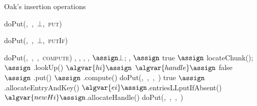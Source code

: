 \begin{algorithm}[htb]
\setlength\belowcaptionskip{0pt}
\setlength\abovecaptionskip{0pt}
\small
\caption{Oak's insertion operations}
\label{alg:doput}
\begin{algorithmic}
\State doPut(\key,\ \givenvalue,\ $\bot$,\ \textsc{put})
\State \Return 
\EndProcedure

\State \Return doPut(\key,\ \givenvalue,\ $\bot$,\ \textsc{putIf})
\EndProcedure


\State doPut(\key,\ \givenvalue,\ ,\ \textsc{compute})
\State \Return 
\EndProcedure
\Statex
{}
\State {}, , , ,  $\assign \bot$; ,  $\assign$ true
\State {} $\assign$ locateChunk(\key); 
{} $\assign$ .lookUp(\key)
  $\algvar{hi} \assign$ 
\EndIf
{} $\algvar{handle} \assign $
\EndIf
{} 
 \label{line:handle.deleted}
 \Return false \label{line:putIf returns false}
\EndIf
{}  $\assign$ .put(\givenvalue) \label{line:handleput}
\EndIf
{} 
\State {} $\assign$ .compute() \label{line:handlecompute}
\EndIf
{} 
\State \Return doPut(\key,\ \givenvalue,\ ,\ ) \label{line:doputretry}
\EndIf
\State \Return true \label{line:doput end case 1}
\EndIf
{}
\State {} $\assign$ .allocateEntryAndKey(\key) \label{line:allocateentry}
\State $\algvar{ei} \assign $.entriesLLputIfAbsent() \label{line:linkentry}
\EndIf
\State $\algvar{newHi} \assign $.allocateHandle() \label{line:allocatehandle}
 \label{line:nospace} 
\State
\Return doPut(\key,\ \givenvalue,\ ,\ )


\end{algorithmic}
\end{algorithm}
